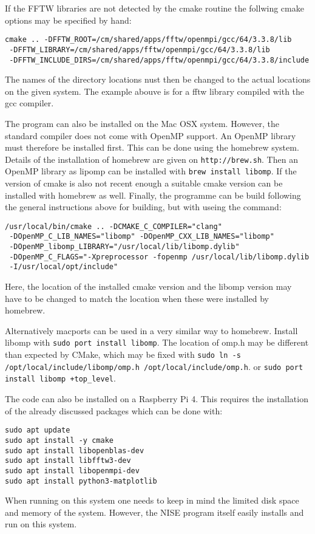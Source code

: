 \documentclass[12pt]{book}
\begin{document}
If the FFTW libraries are not detected by the cmake routine the follwing cmake options may be specified by hand:
\begin{verbatim}
cmake .. -DFFTW_ROOT=/cm/shared/apps/fftw/openmpi/gcc/64/3.3.8/lib
 -DFFTW_LIBRARY=/cm/shared/apps/fftw/openmpi/gcc/64/3.3.8/lib
 -DFFTW_INCLUDE_DIRS=/cm/shared/apps/fftw/openmpi/gcc/64/3.3.8/include
\end{verbatim}
The names of the directory locations nust then be changed to the actual locations on the given system.  The example abouve is for a fftw library compiled with the gcc compiler.

The program can also be installed on the Mac OSX system. However, the standard compiler does not come with OpenMP support. An OpenMP library must therefore be installed first. This can be done using the homebrew system. Details of the installation of homebrew are given on \texttt{http://brew.sh}. Then an OpenMP library as lipomp can be installed with \texttt{brew install libomp}. If the version of cmake is also not recent enough a suitable cmake version can be installed with homebrew as well. Finally, the programme can be build following the general instructions above for building, but with useing the command:\\
\begin{verbatim}
/usr/local/bin/cmake .. -DCMAKE_C_COMPILER="clang"
 -DOpenMP_C_LIB_NAMES="libomp" -DOpenMP_CXX_LIB_NAMES="libomp"
 -DOpenMP_libomp_LIBRARY="/usr/local/lib/libomp.dylib"
 -DOpenMP_C_FLAGS="-Xpreprocessor -fopenmp /usr/local/lib/libomp.dylib
 -I/usr/local/opt/include"
\end{verbatim}
Here, the location of the installed cmake version and the libomp version may have to be changed to match the location when these were installed by homebrew.

Alternatively macports can be used in a very similar way to homebrew. Install libomp with \texttt{sudo port install libomp}. The location of omp.h may be different than expected by CMake, which may be fixed with \texttt{sudo ln -s /opt/local/include/libomp/omp.h /opt/local/include/omp.h}. or \texttt{sudo port install libomp +top\_level}.

The code can also be installed on a Raspberry Pi 4. This requires the installation of the already discussed packages which can be done with:
\begin{verbatim}
sudo apt update
sudo apt install -y cmake
sudo apt install libopenblas-dev
sudo apt install libfftw3-dev
sudo apt install libopenmpi-dev
sudo apt install python3-matplotlib
\end{verbatim}
When running on this system one needs to keep in mind the limited disk space and memory of the system. However, the NISE program itself easily installs and run on this system. 
\end{document}
